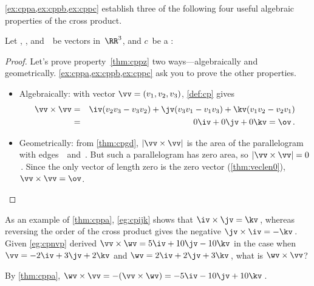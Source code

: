 \cref{ex:cppa,ex:cppb,ex:cppc} establish three of the following four useful algebraic properties of the cross product.

\begin{theorem} \label{thm:cpp}
Let \uv, \vv, and~\wv\ be vectors in~\(\RR^3\), and \(c\)~be a :
\end{theorem}


\begin{proof} 
Let's prove property~\ref{thm:cppz} two ways---algebraically and geometrically.  \cref{ex:cppa,ex:cppb,ex:cppc} ask you to prove the other properties.
\begin{itemize}
\item Algebraically:  with vector \(\vv=(v_1,v_2,v_3)\),  \cref{def:cp} gives
\begin{eqnarray*}
\vv\times\vv
&=&\iv(v_2v_3-v_3v_2)
+\jv(v_3v_1-v_1v_3)
+\kv(v_1v_2-v_2v_1)
\\&=&0\iv+0\jv+0\kv=\ov\,.
\end{eqnarray*}
\item Geometrically: 
from \cref{thm:cpgd}, \(|\vv\times\vv|\) is the area of the parallelogram with edges~\vv\ and~\vv.
But such a parallelogram has zero area, so \(|\vv\times\vv|=0\)\,.
Since the only vector of length zero is the zero vector (\cref{thm:veclen0}), \(\vv\times\vv=\ov\).
\end{itemize}
\end{proof}





\begin{example} 
As an example of \cref{thm:cppa}, \cref{eg:cpijk} shows that \(\iv\times\jv=\kv\)\,, whereas reversing the order of the cross product gives the negative \(\jv\times\iv=-\kv\)\,.  
Given \cref{eg:cpnvp} derived \(\vv\times\wv=5\iv+10\jv-10\kv\) in the case when \(\vv=-2\iv+3\jv+2\kv\) and \(\wv=2\iv+2\jv+3\kv\)\,, what is \(\wv\times\vv\)?
\begin{solution} 
By \ref{thm:cppa},
\(\wv\times\vv=-(\vv\times\wv)=-5\iv-10\jv+10\kv\)\,.
\end{solution}
\end{example}


